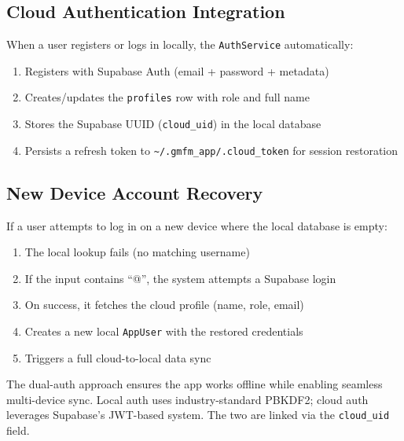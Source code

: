 \documentclass[12pt,a4paper]{article}
\begin{document}
\subsection{Cloud Authentication Integration}

When a user registers or logs in locally, the \texttt{AuthService} automatically:

\begin{enumerate}[leftmargin=2em]
    \item Registers with Supabase Auth (email + password + metadata)
    \item Creates/updates the \texttt{profiles} row with role and full name
    \item Stores the Supabase UUID (\texttt{cloud\_uid}) in the local database
    \item Persists a refresh token to \texttt{\textasciitilde/.gmfm\_app/.cloud\_token} for session restoration
\end{enumerate}

\subsection{New Device Account Recovery}

If a user attempts to log in on a new device where the local database is empty:

\begin{enumerate}[leftmargin=2em]
    \item The local lookup fails (no matching username)
    \item If the input contains ``@'', the system attempts a Supabase login
    \item On success, it fetches the cloud profile (name, role, email)
    \item Creates a new local \texttt{AppUser} with the restored credentials
    \item Triggers a full cloud-to-local data sync
\end{enumerate}

\begin{infobox}
The dual-auth approach ensures the app works offline while enabling seamless multi-device sync. Local auth uses industry-standard PBKDF2; cloud auth leverages Supabase's JWT-based system. The two are linked via the \texttt{cloud\_uid} field.
\end{infobox}

\end{document}
